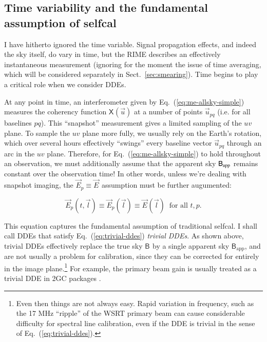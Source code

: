 \documentclass{aa}
\newcommand{\jones}[2]{\vec {#1}_{#2}}
\newcommand{\coh}[2]{\mathsf{{#1}}_{{#2}}}
\begin{document}
\subsection{Time variability and the fundamental assumption of selfcal\label{sec:timevar}}

I have hitherto ignored the time variable. Signal propagation effects, and indeed the sky itself, do vary in time, but the RIME describes an effectively instantaneous measurement (ignoring for the moment the issue of time averaging, which will be considered separately in Sect.~\ref{sec:smearing}). Time begins to play a critical role when we consider DDEs. 

At any point in time, an interferometer given by Eq.~(\ref{eq:me-allsky-simple}) measures the coherency function $\coh{X}{}(\vec u)$ at a number of points $\vec u_{pq}$ (i.e. for all baselines $pq$). This ``snapshot'' measurement gives a limited sampling of the $uv$ plane. To sample the $uv$ plane more fully, we usually rely on the Earth's rotation, which over several hours effectively ``swings'' every baseline vector $\vec u_{pq}$ through an arc in the $uv$ plane. Therefore, for Eq.~(\ref{eq:me-allsky-simple}) to hold throughout an observation, we must additionally assume that the apparent sky $\coh{B}{\rm app}$ remains constant over the observation time! In other words, unless we're dealing with snapshot imaging, the $\jones{E}{p}\equiv\jones{E}{}$ assumption must be further augumented:

\begin{equation}\label{eq:trivial-ddes}
\jones{E}{p}(t,\vec l) \equiv \jones{E}{p}(\vec l) \equiv \jones{E}{}(\vec l)\;\;\mbox{for all~} t,p. 
\end{equation}

This equation captures the fundamental assumption of traditional selfcal. I shall call DDEs that satisfy Eq.~(\ref{eq:trivial-ddes}) \emph{trivial DDEs}. As shown above, trivial DDEs effectively replace the true sky $\coh{B}{}$ by a single apparent sky $\coh{B}{\mathrm{app}}$, and are not usually a problem for calibration, since they can be corrected for entirely in the image plane.\footnote{Even then things are not always easy. Rapid variation in frequency, such as the 17 MHz ``ripple'' of the WSRT primary beam \citep[see Paper II,][Sect.~2.1.1]{RRIME2} can cause considerable difficulty for spectral line calibration, even if the DDE is trivial in the sense of Eq.~(\ref{eq:trivial-ddes}).}  For example, the primary beam gain is usually treated as a trivial DDE in 2GC packages \citep[see Paper II,][Sect.~2.1]{RRIME2}. 
\end{document}
